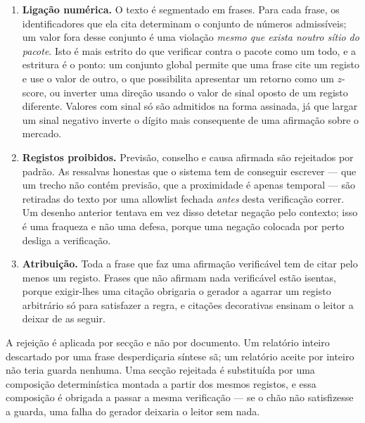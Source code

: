 \begin{enumerate}
  \item \textbf{Ligação numérica.} O texto é segmentado em frases. Para cada frase, os identificadores
        que ela cita determinam o conjunto de números admissíveis; um valor fora desse conjunto é uma
        violação \emph{mesmo que exista noutro sítio do pacote}. Isto é mais estrito do que verificar
        contra o pacote como um todo, e a estritura é o ponto: um conjunto global permite que uma
        frase cite um registo e use o valor de outro, o que possibilita apresentar um retorno como um
        $z$-score, ou inverter uma direção usando o valor de sinal oposto de um registo diferente.
        Valores com sinal só são admitidos na forma assinada, já que largar um sinal negativo inverte
        o dígito mais consequente de uma afirmação sobre o mercado.
  \item \textbf{Registos proibidos.} Previsão, conselho e causa afirmada são rejeitados por padrão. As
        ressalvas honestas que o sistema tem de conseguir escrever --- que um trecho não contém
        previsão, que a proximidade é apenas temporal --- são retiradas do texto por uma allowlist
        fechada \emph{antes} desta verificação correr. Um desenho anterior tentava em vez disso
        detetar negação pelo contexto; isso é uma fraqueza e não uma defesa, porque uma negação
        colocada por perto desliga a verificação.
  \item \textbf{Atribuição.} Toda a frase que faz uma afirmação verificável tem de citar pelo menos um
        registo. Frases que não afirmam nada verificável estão isentas, porque exigir-lhes uma citação
        obrigaria o gerador a agarrar um registo arbitrário só para satisfazer a regra, e citações
        decorativas ensinam o leitor a deixar de as seguir.
\end{enumerate}

A rejeição é aplicada por secção e não por documento. Um relatório inteiro descartado por uma frase
desperdiçaria síntese sã; um relatório aceite por inteiro não teria guarda nenhuma. Uma secção
rejeitada é substituída por uma composição determinística montada a partir dos mesmos registos, e
essa composição é obrigada a passar a mesma verificação --- se o chão não satisfizesse a guarda, uma
falha do gerador deixaria o leitor sem nada.

